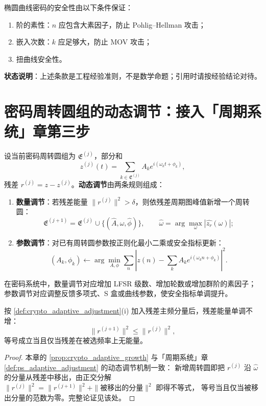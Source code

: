 \begin{remark}\label{prop:ecc_security}
椭圆曲线密码的安全性由以下条件保证：
\begin{enumerate}[label=(\roman*)]
    \item 阶的素性：\(n\) 应包含大素因子，防止 Pohlig--Hellman 攻击；
    \item 嵌入次数：\(k\) 应足够大，防止 MOV 攻击；
    \item 扭曲线安全性。
\end{enumerate}
\textbf{状态说明}：上述条款是工程经验准则，不是数学命题；引用时请按经验结论对待。
\end{remark}

\section{密码周转圆组的动态调节：接入「周期系统」章第三步}
\label{sec:crypto_adaptive}

\begin{definition}[密码周转圆组的动态调节]\label{def:crypto_adaptive_adjustment}
设当前密码周转圆组为 \(\mathfrak E^{(j)}\)，部分和
\[
z^{(j)}(t)=\sum_{k\in\mathfrak E^{(j)}}A_k e^{i(\omega_k t+\phi_k)},
\]
残差 \(r^{(j)}=z-z^{(j)}\)。\textbf{动态调节}由两条规则组成：
\begin{enumerate}[label=(\roman*)]
    \item \textbf{数量调节}：若残差能量 \(\|r^{(j)}\|^2>\delta\)，则依残差周期图峰值新增一个周转圆：
    \[
    \mathfrak E^{(j+1)}=\mathfrak E^{(j)}\cup\{(\hat A,\hat\omega,\hat\phi)\},\qquad
    \hat\omega=\arg\max_\omega|\widehat{z_r}(\omega)|;
    \]
    \item \textbf{参数调节}：对已有周转圆参数按正则化最小二乘或安全指标更新：
    \[
    (A_k,\phi_k)\leftarrow\arg\min_{A,\phi}\sum_n\left|z(n)-\sum_kA_ke^{i(\omega_kn+\phi_k)}\right|^2.
    \]
\end{enumerate}
在密码系统中，数量调节对应增加 LFSR 级数、增加轮数或增加群阶的素因子；参数调节对应调整反馈多项式、S 盒或曲线参数，使安全指标单调提升。
\end{definition}

\begin{proposition}[数量调节的单调性]\label{prop:crypto_adaptive_growth}
按 \cref{def:crypto_adaptive_adjustment}(i) 加入残差主频分量后，残差能量单调不增：
\[
\|r^{(j+1)}\|^2\le\|r^{(j)}\|^2,
\]
等号成立当且仅当残差在被选频率上无能量。
\end{proposition}

\begin{proof}
本章的 \cref{prop:crypto_adaptive_growth} 与「周期系统」章 \cref{def:ps_adaptive_adjustment} 的动态调节机制一致：
新增周转圆即把 $r^{(j)}$ 沿 $\hat\omega$ 的分量从残差中移出，由正交分解
$\|r^{(j)}\|^2=\|r^{(j+1)}\|^2+\|\text{被移出的分量}\|^2$ 即得不等式，
等号当且仅当被移出分量的范数为零。完整论证见该处。
\end{proof}

